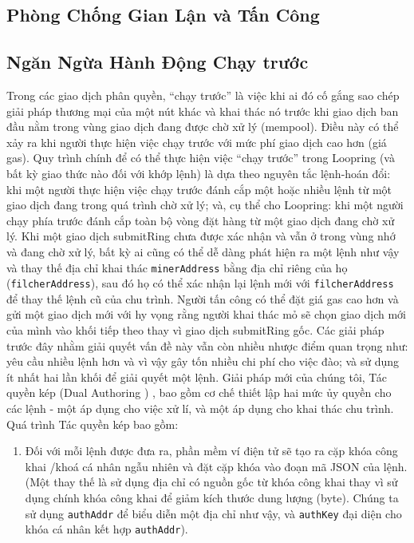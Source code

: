 \documentclass{article}
\begin{document}
\begin{multicols}{2}
\section{Phòng Chống Gian Lận và Tấn Công}
\subsection{Ngăn Ngừa Hành Động Chạy trước\label{sec:dual_authoring}}
Trong các giao dịch phân quyền, “chạy trước” là việc khi ai đó cố gắng sao chép giải pháp thương mại của một nút khác và khai thác nó trước khi giao dịch ban đầu nằm trong vùng giao dịch đang được chờ xử lý (mempool). Điều này có thể xảy ra khi người thực hiện việc chạy trước với mức phí giao dịch cao hơn (giá gas). Quy trình chính để có thể thực hiện việc “chạy trước” trong Loopring (và bất kỳ giao thức nào đối với khớp lệnh) là dựa theo nguyên tắc lệnh-hoán đổi: khi một người thực hiện việc chạy trước  đánh cắp một hoặc nhiều lệnh từ một giao dịch đang trong quá trình chờ xử lý; và, cụ thể cho Loopring: khi một người chạy phía trước đánh cắp toàn bộ vòng đặt hàng từ một giao dịch đang chờ xử lý.
Khi một giao dịch submitRing chưa được xác nhận và vẫn ở trong vùng nhớ và đang chờ xử lý, bất kỳ ai cũng có thể dễ dàng phát hiện ra một lệnh như vậy và thay thế địa chỉ khai thác \verb|minerAddress| bằng địa chỉ riêng của họ (\verb|filcherAddress|), sau đó họ có thể xác nhận lại lệnh mới với \verb|filcherAddress| để thay thế lệnh cũ của chu trình. Người tấn công có thể đặt giá gas cao hơn và gửi một giao dịch mới với hy vọng rằng người khai thác mỏ sẽ chọn giao dịch mới của mình vào khối tiếp theo thay vì giao dịch submitRing gốc.
Các giải pháp trước đây nhằm giải quyết vấn đề này vẫn còn nhiều nhược điểm quan trọng như: yêu cầu nhiều lệnh hơn và vì vậy gây tốn nhiều chi phí cho việc đào; và sử dụng ít nhất hai lần khối để giải quyết một lệnh. Giải pháp mới của chúng tôi, Tác quyền kép (Dual Authoring ) \cite{dualauthor}, bao gồm cơ chế thiết lập hai mức ủy quyền cho các lệnh - một áp dụng cho việc xử lí, và một áp dụng cho khai thác chu trình.
Quá trình Tác quyền kép bao gồm:
\begin{enumerate}
	\item Đối với mỗi lệnh được đưa ra, phần mềm ví điện tử sẽ tạo ra cặp khóa công khai /khoá cá nhân ngẫu nhiên và đặt cặp khóa vào đoạn mã JSON của lệnh. (Một thay thế là sử dụng địa chỉ có nguồn gốc từ khóa công khai thay vì sử dụng chính khóa công khai để giảm kích thước dung lượng (byte). Chúng ta sử dụng  \verb|authAddr| để biểu diễn một địa chỉ như vậy, và \verb|authKey| đại diện cho khóa cá nhân kết hợp \verb|authAddr|).

\end{enumerate}
\end{multicols}
\end{document}
